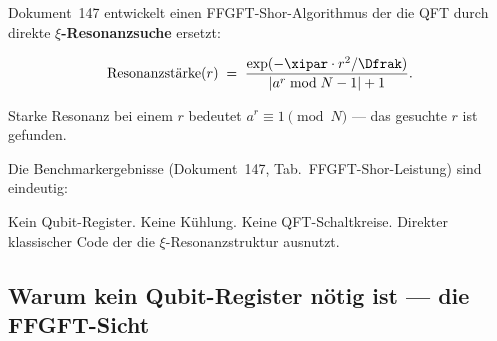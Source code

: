 Dokument~147 entwickelt einen FFGFT-Shor-Algorithmus
der die QFT durch direkte \textbf{$\xi$-Resonanzsuche}
ersetzt:

\begin{equation}
  \text{Resonanzstärke}(r) \;=\;
  \frac{\exp(-\xipar \cdot r^2 / \Dfrak)}
       {|a^r \bmod N - 1| + 1}.
\end{equation}

Starke Resonanz bei einem $r$ bedeutet
$a^r \equiv 1 \pmod{N}$ ---
das gesuchte $r$ ist gefunden.

Die Benchmarkergebnisse (Dokument~147,
Tab.~FFGFT-Shor-Leistung) sind eindeutig:

\begin{center}
\end{center}

Kein Qubit-Register. Keine Kühlung.
Keine QFT-Schaltkreise. Direkter klassischer Code
der die $\xi$-Resonanzstruktur ausnutzt.

\subsection{Warum kein Qubit-Register nötig ist ---
  die FFGFT-Sicht}

